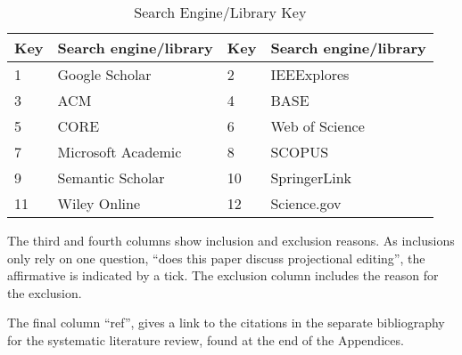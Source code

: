 \begin{table}[h]
    \begin{center}
        \begin{tabular}{ | l | l | l | l |} 
            \hline
            Key & Search engine/library    & Key & Search engine/library     \\
            \hline
            \hline
            1  & Google Scholar            & 2  & IEEExplores                \\
            3  & ACM                       & 4  & BASE                       \\
            5  & CORE                      & 6  & Web of Science             \\
            7  & Microsoft Academic        & 8  & SCOPUS                     \\
            9  & Semantic Scholar          & 10 & SpringerLink               \\
            11 & Wiley Online              & 12 & Science.gov                \\
            \hline
        \end{tabular}
    \end{center}
    \caption{Search Engine/Library Key}
    \label{table:SearchEngineKey}
\end{table}

The third and fourth columns show inclusion and exclusion reasons.
As inclusions only rely on one question, ``does this paper discuss projectional editing'', the affirmative is indicated by a tick.
The exclusion column includes the reason for  the exclusion.

The final column ``ref'', gives a link to the citations in the separate bibliography for the systematic literature review, found at the end of the Appendices.

